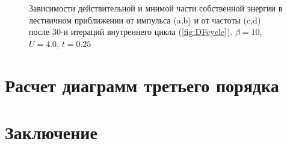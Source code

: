 \documentclass[11pt,a4paper]{report}
\begin{document}
\begin{figure}[H]
\caption{Зависимости действительной и мнимой части собственной энергии в лестничном приближении от импульса (a,b) и от частоты (c,d) после 30-и итераций внутреннего цикла (\ref{fig:DFcycle}). $\beta=10$, $U=4.0$, $t=0.25$}
\label{SigmaLDFA}
\end{figure}

\section{Расчет диаграмм третьего порядка}

\section{Заключение}
\end{document}
